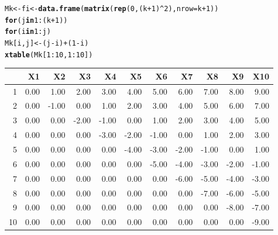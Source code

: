 \documentclass{article}\usepackage[]{graphicx}\usepackage[]{color}
\makeatletter
\newcommand{\hlnum}[1]{\textcolor[rgb]{0.686,0.059,0.569}{#1}}%
\newcommand{\hlopt}[1]{\textcolor[rgb]{0,0,0}{#1}}%
\newcommand{\hlstd}[1]{\textcolor[rgb]{0.345,0.345,0.345}{#1}}%
\newcommand{\hlkwa}[1]{\textcolor[rgb]{0.161,0.373,0.58}{\textbf{#1}}}%
\newcommand{\hlkwb}[1]{\textcolor[rgb]{0.69,0.353,0.396}{#1}}%
\newcommand{\hlkwc}[1]{\textcolor[rgb]{0.333,0.667,0.333}{#1}}%
\newcommand{\hlkwd}[1]{\textcolor[rgb]{0.737,0.353,0.396}{\textbf{#1}}}%
\newenvironment{kframe}{%
 \def\at@end@of@kframe{}%
 \ifinner\ifhmode%
  \def\at@end@of@kframe{\end{minipage}}%
  \begin{minipage}{\columnwidth}%
 \fi\fi%
 \def\FrameCommand##1{\hskip\@totalleftmargin \hskip-\fboxsep
 \colorbox{shadecolor}{##1}\hskip-\fboxsep
     \hskip-\linewidth \hskip-\@totalleftmargin \hskip\columnwidth}%
 \MakeFramed {\advance\hsize-\width
   \@totalleftmargin\z@ \linewidth\hsize
   \@setminipage}}%
 {\par\unskip\endMakeFramed%
 \at@end@of@kframe}
\makeatother
\begin{document}
\begin{kframe}
\begin{alltt}
\hlstd{Mk} \hlkwb{<-} \hlstd{fi} \hlkwb{<-} \hlkwd{data.frame}\hlstd{(}\hlkwd{matrix}\hlstd{(}\hlkwd{rep}\hlstd{(}\hlnum{0}\hlstd{, (k} \hlopt{+} \hlnum{1}\hlstd{)}\hlopt{^}\hlnum{2}\hlstd{),} \hlkwc{nrow} \hlstd{= k} \hlopt{+} \hlnum{1}\hlstd{))}
\hlkwa{for}\hlstd{(j} \hlkwa{in} \hlnum{1}\hlopt{:}\hlstd{(k} \hlopt{+} \hlnum{1}\hlstd{))}
 \hlkwa{for}\hlstd{(i} \hlkwa{in} \hlnum{1}\hlopt{:}\hlstd{j)}
   \hlstd{Mk[i,j]} \hlkwb{<-} \hlstd{(j}\hlopt{-}\hlstd{i)} \hlopt{+} \hlstd{(}\hlnum{1}\hlopt{-}\hlstd{i)}
\hlkwd{xtable}\hlstd{(Mk[}\hlnum{1}\hlopt{:}\hlnum{10}\hlstd{,} \hlnum{1}\hlopt{:}\hlnum{10}\hlstd{])}
\end{alltt}
\end{kframe}%
\begin{table}[ht]
\centering
\begin{tabular}{rrrrrrrrrrr}
  \hline
 & X1 & X2 & X3 & X4 & X5 & X6 & X7 & X8 & X9 & X10 \\ 
  \hline
1 & 0.00 & 1.00 & 2.00 & 3.00 & 4.00 & 5.00 & 6.00 & 7.00 & 8.00 & 9.00 \\ 
  2 & 0.00 & -1.00 & 0.00 & 1.00 & 2.00 & 3.00 & 4.00 & 5.00 & 6.00 & 7.00 \\ 
  3 & 0.00 & 0.00 & -2.00 & -1.00 & 0.00 & 1.00 & 2.00 & 3.00 & 4.00 & 5.00 \\ 
  4 & 0.00 & 0.00 & 0.00 & -3.00 & -2.00 & -1.00 & 0.00 & 1.00 & 2.00 & 3.00 \\ 
  5 & 0.00 & 0.00 & 0.00 & 0.00 & -4.00 & -3.00 & -2.00 & -1.00 & 0.00 & 1.00 \\ 
  6 & 0.00 & 0.00 & 0.00 & 0.00 & 0.00 & -5.00 & -4.00 & -3.00 & -2.00 & -1.00 \\ 
  7 & 0.00 & 0.00 & 0.00 & 0.00 & 0.00 & 0.00 & -6.00 & -5.00 & -4.00 & -3.00 \\ 
  8 & 0.00 & 0.00 & 0.00 & 0.00 & 0.00 & 0.00 & 0.00 & -7.00 & -6.00 & -5.00 \\ 
  9 & 0.00 & 0.00 & 0.00 & 0.00 & 0.00 & 0.00 & 0.00 & 0.00 & -8.00 & -7.00 \\ 
  10 & 0.00 & 0.00 & 0.00 & 0.00 & 0.00 & 0.00 & 0.00 & 0.00 & 0.00 & -9.00 \\ 
   \hline
\end{tabular}
\end{table}
\end{document}
